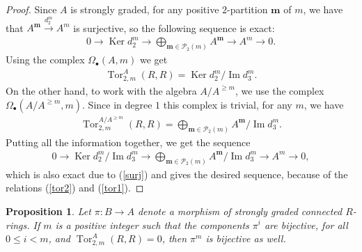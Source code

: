 \documentclass[pdftex]{sigma}
\newcommand{\bs}[1]{\boldsymbol{#1}}
\DeclareMathOperator{\Ker}{Ker}
\DeclareMathOperator{\im}{Im}
\DeclareMathOperator{\Tor}{Tor}
\renewcommand{\^}[1]{\mbox{$^{\left( #1 \right)}$}}
\renewcommand{\_}[1]{\mbox{$_{\left( #1 \right)}$}}
\numberwithin{equation}{section}
\newtheorem{Proposition}[Theorem]{Proposition}
{ \theoremstyle{definition}
\newtheorem{Definition}[Theorem]{Definition}
\newtheorem{Remark}[Theorem]{Remark}
}
\begin{document}
\begin{proof}
 Since $A$ is strongly graded, for any positive $2$-partition $\boldsymbol{m}$ of $m$, we have that $A^{\boldsymbol{m}} \xrightarrow{d_2^m} A^m$ is surjective, so the following sequence is exact:
\begin{gather} \label{surj}
0 \rightarrow \Ker d^m_2 \rightarrow \bigoplus\limits_{\bs{m}\in\mathscr{P}_2(m)}A^{\bs{m}}\rightarrow A^m \rightarrow 0.
\end{gather}
Using the complex $\Omega_\bullet(A,m)$ we get
\begin{gather} \label{tor2}
\operatorname{Tor}_{2,m}^A(R,R)=\operatorname{Ker}d_2^m/\operatorname{Im}d_3^m.
\end{gather}
On the other hand, to work with the algebra $A/A^{\geq m}$, we use the complex $\Omega_\bullet(A/A^{\geq m},m)$. Since in degree $1$ this complex is trivial, for any $m$, we have
\begin{gather} \label{tor1}
\Tor_{2,m}^{A/A^{\geq m}}(R,R)= \bigoplus\limits_{\bs{m}\in\mathscr{P}_2(m)} A^{\bs{m}}/\im d_3^m.
\end{gather}
Putting all the information together, we get the sequence
\begin{gather*}
0 \longrightarrow\Ker d^m_2/\im d_3^m \longrightarrow \bigoplus\limits_{\bs{m}\in\mathscr{P}_2(m)} A^{\bs{m}}/\im d_3^m \longrightarrow A^m \longrightarrow 0,
\end{gather*}
which is also exact due to (\ref{surj}) and gives the desired sequence, because of the relations (\ref{tor2}) and (\ref{tor1}).
\end{proof}

\begin{Proposition}\label{proptor}
Let $\pi\colon B\to A$ denote a morphism of strongly graded connected $R$-rings. If $m$ is a positive integer such that the components $\pi^i$ are bijective, for all $0\leq i <m$, and $\Tor_{2,m}^A(R,R)=0$, then $\pi^m$ is bijective as well.
\end{Proposition}
\end{document}
